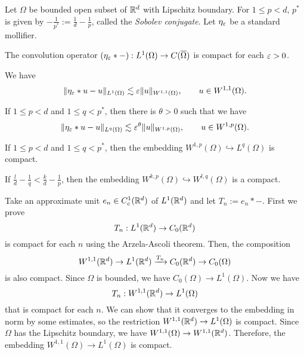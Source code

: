 \documentclass{../../large}
\begin{document}
\begin{prb}
Let $\Omega$ be bounded open subset of $\mathbb{R}^d$ with Lipschitz boundary.
For $1\le p<d$, $p^*$ is given by $-\frac1{p^*}:=\frac1d-\frac1p$, called the \emph{Sobolev conjugate}.
Let $\eta_\varepsilon$ be a standard mollifier.
\begin{parts}
\item The convolution operator $(\eta_\varepsilon*-):L^1(\Omega)\to C(\overline\Omega)$ is compact for each $\varepsilon>0$.
\item We have
\[\|\eta_\varepsilon*u-u\|_{L^1(\Omega)}\lesssim\varepsilon\|u\|_{W^{1,1}(\Omega)},\qquad u\in W^{1,1}(\Omega).\]
\item If $1\le p<d$ and $1\le q<p^*$, then there is $\theta>0$ such that we have
\[\|\eta_\varepsilon*u-u\|_{L^q(\Omega)}\lesssim\varepsilon^\theta\|u\|_{W^{1,p}(\Omega)},\qquad u\in W^{1,p}(\Omega).\]
\item If $1\le p<d$ and $1\le q<p^*$, then the embedding $W^{1,p}(\Omega)\hookrightarrow L^q(\Omega)$ is compact.
\item If $\frac ld-\frac1q<\frac kd-\frac1p$, then the embedding $W^{k,p}(\Omega)\hookrightarrow W^{l,q}(\Omega)$ is a compact.
\end{parts}
\end{prb}
\begin{pf}[Sketch]
Take an approximate unit $e_n\in C_c^1(\mathbb{R}^d)$ of $L^1(\mathbb{R}^d)$ and let $T_n:=e_n*-$.
First we prove
\[T_n:L^1(\mathbb{R}^d)\to C_0(\mathbb{R}^d)\]
is compact for each $n$ using the Arzela-Ascoli theorem.
Then, the composition
\[W^{1,1}(\mathbb{R}^d)\to L^1(\mathbb{R}^d)\xrightarrow{T_n}C_0(\mathbb{R}^d)\to C_0(\Omega)\]
is also compact.
Since $\Omega$ is bounded, we have $C_0(\Omega)\to L^1(\Omega)$.
Now we have
\[T_n:W^{1,1}(\mathbb{R}^d)\to L^1(\Omega)\]
that is compact for each $n$.
We can show that it converges to the embedding in norm by some estimates, so the restriction $W^{1,1}(\mathbb{R}^d)\to L^1(\Omega)$ is compact.
Since $\Omega$ has the Lipschitz boundary, we have $W^{1,1}(\Omega)\to W^{1,1}(\mathbb{R}^d)$.
Therefore, the embedding $W^{1,1}(\Omega)\to L^1(\Omega)$ is compact.
\end{pf}
\end{document}
